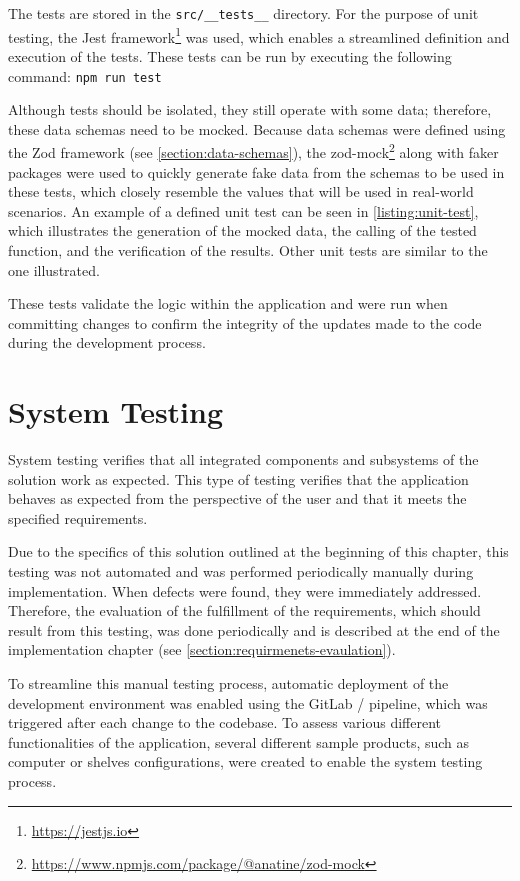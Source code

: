 The tests are stored in the \texttt{src/\_\_tests\_\_} directory. For the purpose of unit testing, the Jest framework\footnote{\url{https://jestjs.io}} was used, which enables a streamlined definition and execution of the tests. These tests can be run by executing the following command: \texttt{npm run test}

Although tests should be isolated, they still operate with some data; therefore, these data schemas need to be mocked. Because data schemas were defined using the Zod framework (see \autoref{section:data-schemas}), the zod-mock\footnote{\url{https://www.npmjs.com/package/@anatine/zod-mock}} along with faker packages were used to quickly generate fake data from the schemas to be used in these tests, which closely resemble the values that will be used in real-world scenarios. An example of a defined unit test can be seen in \autoref{listing:unit-test}, which illustrates the generation of the mocked data, the calling of the tested function, and the verification of the results. Other unit tests are similar to the one illustrated.

These tests validate the logic within the application and were run when committing changes to confirm the integrity of the updates made to the code during the development process.


\section{System Testing}

System testing verifies that all integrated components and subsystems of the solution work as expected. This type of testing verifies that the application behaves as expected from the perspective of the user and that it meets the specified requirements.~\cite{Stephens2023}

Due to the specifics of this solution outlined at the beginning of this chapter, this testing was not automated and was performed periodically manually during implementation. When defects were found, they were immediately addressed. Therefore, the evaluation of the fulfillment of the requirements, which should result from this testing, was done periodically and is described at the end of the implementation chapter (see \autoref{section:requirmenets-evaulation}).

To streamline this manual testing process, automatic deployment of the development environment was enabled using the GitLab / pipeline, which was triggered after each change to the codebase. To assess various different functionalities of the application, several different sample products, such as computer or shelves configurations, were created to enable the system testing process. 

